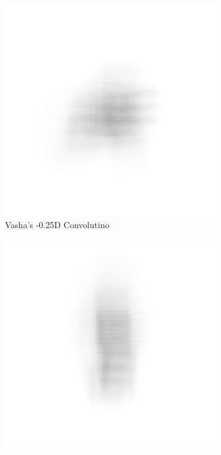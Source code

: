 \documentclass{article}
\begin{document}
\begin{figure}[H]
\begin{subfigure}{.3\textwidth}
  \centering
  \includegraphics[width=1\linewidth]{Vasha_R_G_0530_2_500_zer_-025_5_PSF_convE.png}
  \caption{Vasha's -0.25D Convolutino}
  \label{fig:vashan025d}
\end{subfigure}
\begin{subfigure}{.3\textwidth}
  \centering
  \includegraphics[width=1\linewidth]{Liz_R_G_0523_2_500_zer_-025_5_PSF_convE.png}

\end{subfigure}
\end{figure}
\end{document}
